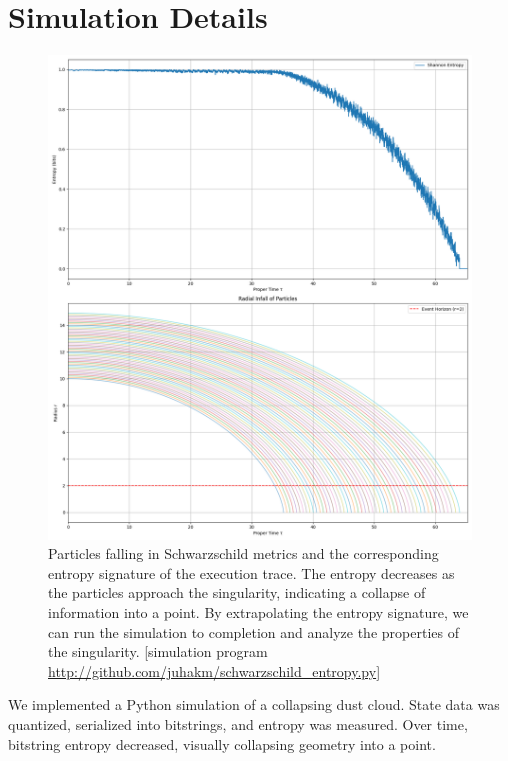 \documentclass[11pt]{article}
\begin{document}
\section{Simulation Details}

\begin{figure}[h!]
  \centering
  \includegraphics[width=1.0\textwidth]{figures/schwarzschild_entropy_signature.png}
  \caption{Particles falling in Schwarzschild metrics and the corresponding entropy signature of the execution trace. The entropy decreases as the particles approach the singularity, indicating a collapse of information into a point. By extrapolating the entropy signature, we can run the simulation to completion and analyze the properties of the singularity.
      [simulation program \url{http://github.com/juhakm/schwarzschild_entropy.py}]}
  \label{fig:vanishing_entropy}
\end{figure}




We implemented a Python simulation of a collapsing dust cloud. State data was quantized, serialized into bitstrings, and entropy was measured. Over time, bitstring entropy decreased, visually collapsing geometry into a point.
\end{document}
